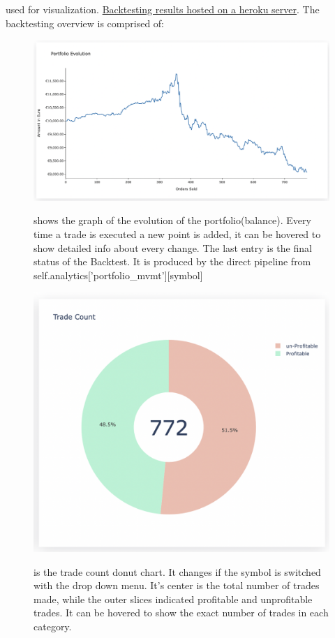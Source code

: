 \documentclass{article}
\begin{document}
used for visualization. \href{https://do-nothing-option.herokuapp.com/}{Backtesting results hosted on a heroku server}. The backtesting overview is comprised of:
\pagebreak
\begin{figure}[!h]
\centering
\includegraphics[scale=0.3]{port_evo.png}
\label{fig:portfolio evolution}
\caption{shows the graph of the evolution of the portfolio(balance). Every time a trade is executed a new point is added, it can be hovered to show detailed info about every change. The last entry is the final status of the Backtest. It is produced by the direct pipeline from  self.analytics['portfolio\_mvmt'][symbol]}
\end{figure}

\begin{figure}[!h]
\centering
\includegraphics[scale=0.3]{trd_cnt.png}
\label{fig:trade count}
\caption{is the trade count donut chart. It changes if the symbol is switched with the drop down menu. It's center is the total number of trades made, while the outer slices indicated profitable and unprofitable trades. It can be hovered to show the exact number of trades in each category.}
\end{figure}
\end{document}
